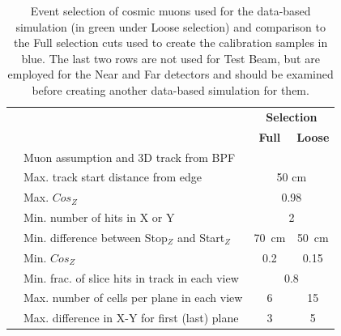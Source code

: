 \begin{table}[!ht]
\centering
\caption[Overview of the event selection for the data-based simulation]{Event selection of cosmic muons used for the data-based simulation (in green under Loose selection) and comparison to the Full selection cuts used to create the calibration samples in blue. The last two rows are not used for Test Beam, but are employed for the Near and Far detectors and should be examined before creating another data-based simulation for them.}
\begin{tabular}{clcc}
& \multirow{2}{*}{\centering{\textbf{Cut}}} & \multicolumn{2}{c}{\textbf{Selection}}\\
& & \cellcolor[HTML]{3166FF}\textbf{Full} & \cellcolor[HTML]{32CB00}\textbf{Loose}\\\hline
                                   & Muon assumption and 3D track from BPF         &                                             &                                          \\
                                   & Max. track start distance from edge                       & \multicolumn{2}{c}{50 cm}                                                                 \\
                                   & Max. $Cos_{Z}$                                            & \multicolumn{2}{c}{0.98}                                                               \\ \hline
                                   & Min. number of hits in X or Y                             & \multicolumn{2}{c}{\cellcolor[HTML]{FFFFFF}2}                                          \\
                                   & Min. difference between Stop$_{Z}$ and Start$_{Z}$        & \cellcolor[HTML]{3166FF}70~cm                 & \cellcolor[HTML]{32CB00}50~cm             \\
                                   & Min. $Cos_{Z}$ & \cellcolor[HTML]{3166FF}0.2                 & \cellcolor[HTML]{32CB00}0.15             \\
                                   & Min. frac. of slice hits in track in each view    & \multicolumn{2}{c}{0.8}                                                                \\
                                   & Max. number of cells per plane in each view               & \cellcolor[HTML]{3166FF}6                   & \cellcolor[HTML]{32CB00}15               \\
                                   & Max. difference in X-Y for first (last) plane     & \cellcolor[HTML]{3166FF}3                   & \cellcolor[HTML]{32CB00}5                \\

\end{tabular}
\end{table}
